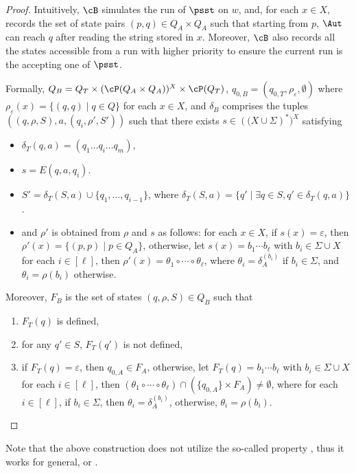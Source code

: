\begin{proof}
Intuitively, $\cB$ simulates the run of $\psst$ on $w$, and, for each $x \in X$, records the set of state pairs $(p, q) \in Q_A \times Q_A$ such that starting from $p$, $\Aut$ can reach $q$ after reading the string stored in $x$. Moreover, $\cB$ also records all the states accessible from a run with higher priority to ensure the current run is the accepting one of $\psst$.

Formally, $Q_B = Q_T \times (\cP(Q_A \times Q_A ))^{X} \times \cP(Q_T)  $, $q_{0, B} = (q_{0, T}, \rho_{\varepsilon}, \emptyset)$ where $\rho_{\varepsilon} (x) = \{(q, q) \mid q \in Q\}$ for each $x \in X$, and $\delta_{B}$ comprises the tuples $((q, \rho, S), a, (q_i, \rho', S'))$ such that there exists $s \in \left((X \cup \Sigma\right)^*)^X$ satisfying
\begin{itemize}
\item $\delta_T (q, a) = (q_1 \ldots q_i \ldots q_m)$, 
\item $s = E(q,a,q_i)$.
\item $S' = \delta_T (S, a) \cup \{ q_1, \ldots, q_{i - 1} \}$, where $\delta_T(S,a) = \{q' \mid \exists q \in S, q' \in \delta_T(q,a)\}$.
\item and $\rho'$ is obtained from $\rho$ and $s$ as follows: for each $x \in X$, if $s(x) = \varepsilon$, then $\rho'(x) = \{(p, p) \mid p \in Q_A\}$, otherwise, let $s(x) = b_1 \cdots b_\ell$ with $b_i \in \Sigma \cup X$ for each $i \in [\ell]$, then $\rho'(x) = \theta_1 \circ \cdots \circ \theta_\ell$, where $\theta_i = \delta^{(b_i)}_A$ if $b_i \in \Sigma$, and $\theta_i = \rho(b_i)$ otherwise.
%
\end{itemize}

Moreover, $F_B$ is the set of states $(q, \rho, S) \in Q_B$ such that
\begin{enumerate}
  \item $F_T (q)$ is defined,
%
  \item for any $q' \in S$, $F_T (q')$ is not defined,
  \item if $F_T(q) = \varepsilon$, then $q_{0, A}  \in F_A$, otherwise, 
let $F_T(q) = b_1 \cdots b_\ell$ with $b_i \in \Sigma \cup X$ for each $i \in [\ell]$, then $(\theta_1 \circ \cdots \circ \theta_\ell) \cap (\{q_{0,A}\} \times F_A) \neq \emptyset$, where for each $i \in [\ell]$, if $b_i \in \Sigma$, then $\theta_i = \delta^{(b_i)}_A$, otherwise, $\theta_i = \rho(b_i)$.
\end{enumerate}
\end{proof}

Note that the above construction  does not utilize the so-called  property \cite{AC10,AD11},
  thus it works for general, or  \PSST{} \cite{FR17}.




